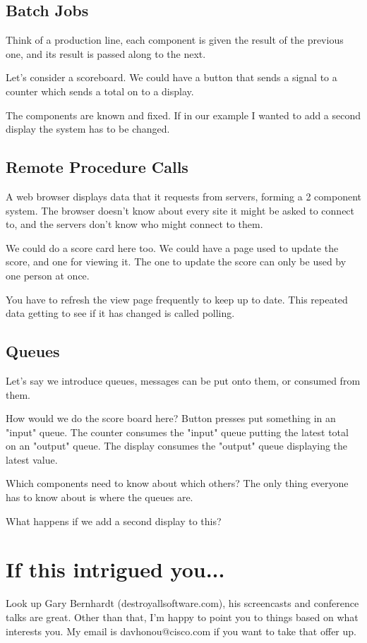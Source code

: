 \documentclass{article}
\begin{document}
\subsection{Batch Jobs}
Think of a production line, each component is given the result of the previous
one, and its result is passed along to the next.

Let's consider a scoreboard.
We could have a button that sends a signal to a counter which sends a total on
to a display.

The components are known and fixed.
If in our example I wanted to add a second display the system has to be
changed.

\subsection{Remote Procedure Calls}
A web browser displays data that it requests from servers, forming a 2
component system. The browser doesn't know about every site it might be asked
to connect to, and the servers don't know who might connect to them.

We could do a score card here too.
We could have a page used to update the score, and one for viewing it.
The one to update the score can only be used by one person at once.

You have to refresh the view page frequently to keep up to date.
This repeated data getting to see if it has changed is called polling.

\subsection{Queues}
Let's say we introduce queues, messages can be put onto them, or consumed from them.

How would we do the score board here?
Button presses put something in an "input" queue.
The counter consumes the "input" queue putting the latest total on an "output" queue.
The display consumes the "output" queue displaying the latest value.

Which components need to know about which others?
The only thing everyone has to know about is where the queues are.

What happens if we add a second display to this?

\section{If this intrigued you...}
Look up Gary Bernhardt (destroyallsoftware.com), his screencasts and conference
talks are great.
Other than that, I'm happy to point you to things based on what interests you.
My email is davhonou@cisco.com if you want to take that offer up.
\end{document}
